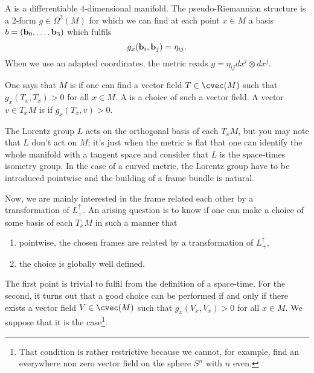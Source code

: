 A  is a differentiable  $4$-dimensional manifold. The pseudo-Riemannian structure is a $2$-form $g\in\Omega^2(M)$ for which we can find at each point $x\in M$ a basis $b=({\bf b}_0,\ldots,{\bf b}_3)$ which fulfils
\[
  g_x({\bf b}_i,{\bf b}_j)=\eta_{ij}.
\]
When we use an adapted coordinates, the metric reads $g=\eta_{ij}dx^i\otimes dx^j$.

One says that $M$ is  if one can find a vector field $T\in\cvec(M)$ such that $g_x(T_x,T_x)>0$ for all $x\in M$. A  is a choice of such a vector field. A vector $v\in T_xM$ is  if $g_x(T_x,v)>0$.

The Lorentz group $L$ acts on the orthogonal basis of each $T_xM$, but you may note that $L$ don't act on $M$; it's just when the metric is flat that one can identify the whole manifold with a tangent space and consider that $L$ is the space-times isometry group. In the case of a curved metric, the Lorentz group have to be introduced pointwise and the building of a frame bundle is natural.

Now, we are mainly interested in the frame related each other by a transformation of $L_+^{\uparrow}$. An arising question is to know if one can make a choice of some basis of each $T_xM$ in such a manner that 

\begin{enumerate}
\item pointwise, the chosen frames are related by a transformation of $L_+^{\uparrow}$,
\item the choice is globally well defined.
\end{enumerate}
The first point is trivial to fulfil from the definition of a space-time. For the second, it turns out that a good choice can be performed if and only if there exists a vector field $V\in\cvec(M)$ such that $g_x(V_x,V_x)>0$ for all $x\in M$. We suppose that it is the case\footnote{That condition is rather restrictive because we cannot, for example, find an everywhere non zero vector field on the sphere $S^n$ with $n$ even.}.

